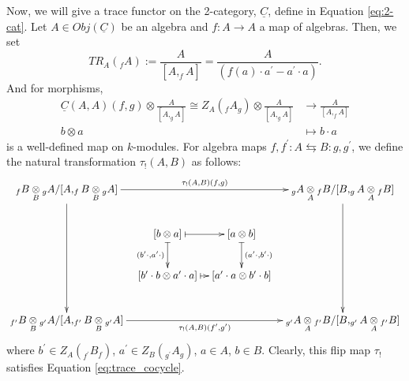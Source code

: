 %
Now, we will give a trace functor on the 
2-category, $\underline{C}$, define in Equation 
\ref{eq:2-cat}. Let $A \in Obj(\underline{C})$ 
be an algebra and $f: A \to A$ a map of algebras. 
Then, we set
$$TR_A(_fA) := \frac{A}{[A, _fA]}
= \frac{A}{(f(a)\cdot a^\prime - a^\prime \cdot a)}.$$
And for morphisms, 
\begin{align*}
\underline{C}(A,A)(f,g) \otimes \frac{A}{[A, _gA]}
\cong Z_A(_fA_g) \otimes \frac{A}{[A, _gA]}
&\to \frac{A}{[A, _fA]}\\
b \otimes a
&\mapsto 
b\cdot a
\end{align*}
is a well-defined map on $k$-modules. 
For algebra maps $f,f^\prime:A \leftrightarrows 
B:g,g^\prime$, 
we define 
the natural transformation $\tau_!(A,B)$ 
as follows:
$$
\xymatrixcolsep{0.65pc}
\xymatrix{
  _fB \underset{B}{\otimes} { _gA}/
    [A, _fB \underset{B}{\otimes} { _gA}]
  \ar[rrr]^{\tau_!(A,B)(f,g)}
  \ar[ddd]
  &&& _gA \underset{A}{\otimes} { _fB}/
    [B, _gA \underset{A}{\otimes} { _fB}]
  \ar[ddd]\\
  &[b \otimes a] 
  \ar@{|->}[r]
  \ar@{|->}[d]_{(b^\prime \cdot, a^\prime \cdot)}
  & [a \otimes b]
  \ar@{|->}[d]^{(a^\prime \cdot, b^\prime \cdot)}\\
  & [b^\prime \cdot b \otimes a^\prime \cdot a]
  \ar@{|->}[r]
  & [a^\prime \cdot a \otimes b^\prime \cdot b]\\
  _{f^\prime}B \underset{B}{\otimes} { _{g^\prime}A}/
    [A, _{f^\prime}B \underset{B}{\otimes} { _{g^\prime}A}]
  \ar[rrr]_{\tau_!(A,B)(f^\prime,g^\prime)}
  &&& _{g^\prime}A \underset{A}{\otimes} { _{f^\prime}B}/
  [B, _{g^\prime}A \underset{A}{\otimes} { _{f^\prime}B}]\\
}
$$
where $b^\prime \in Z_A(_{f^\prime}B_f)$, 
$a^\prime \in Z_B(_{g^\prime}A_g)$, $a \in A$, 
$b \in B$. Clearly, this flip map $\tau_!$ satisfies 
Equation \ref{eq:trace_cocycle}.





